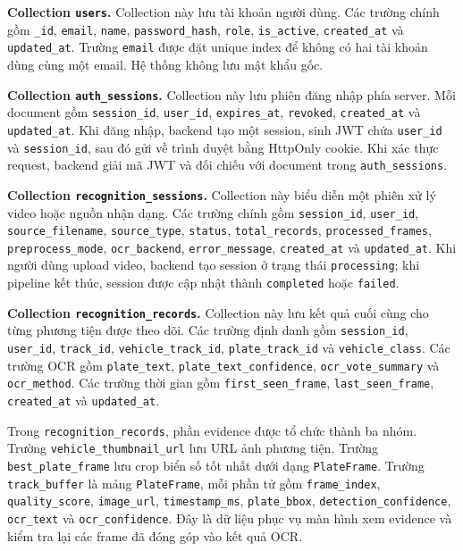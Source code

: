 \documentclass[../DoAn.tex]{subfiles}
\begin{document}
\textbf{Collection \texttt{users}.} Collection này lưu tài khoản người dùng. Các trường chính gồm \texttt{\_id}, \texttt{email}, \texttt{name}, \texttt{password\_hash}, \texttt{role}, \texttt{is\_active}, \texttt{created\_at} và \texttt{updated\_at}. Trường \texttt{email} được đặt unique index để không có hai tài khoản dùng cùng một email. Hệ thống không lưu mật khẩu gốc.

\textbf{Collection \texttt{auth\_sessions}.} Collection này lưu phiên đăng nhập phía server. Mỗi document gồm \texttt{session\_id}, \texttt{user\_id}, \texttt{expires\_at}, \texttt{revoked}, \texttt{created\_at} và \texttt{updated\_at}. Khi đăng nhập, backend tạo một session, sinh JWT chứa \texttt{user\_id} và \texttt{session\_id}, sau đó gửi về trình duyệt bằng HttpOnly cookie. Khi xác thực request, backend giải mã JWT và đối chiếu với document trong \texttt{auth\_sessions}.

\textbf{Collection \texttt{recognition\_sessions}.} Collection này biểu diễn một phiên xử lý video hoặc nguồn nhận dạng. Các trường chính gồm \texttt{session\_id}, \texttt{user\_id}, \texttt{source\_filename}, \texttt{source\_type}, \texttt{status}, \texttt{total\_records}, \texttt{processed\_frames}, \texttt{preprocess\_mode}, \texttt{ocr\_backend}, \texttt{error\_message}, \texttt{created\_at} và \texttt{updated\_at}. Khi người dùng upload video, backend tạo session ở trạng thái \texttt{processing}; khi pipeline kết thúc, session được cập nhật thành \texttt{completed} hoặc \texttt{failed}.

\textbf{Collection \texttt{recognition\_records}.} Collection này lưu kết quả cuối cùng cho từng phương tiện được theo dõi. Các trường định danh gồm \texttt{session\_id}, \texttt{user\_id}, \texttt{track\_id}, \texttt{vehicle\_track\_id}, \texttt{plate\_track\_id} và \texttt{vehicle\_class}. Các trường OCR gồm \texttt{plate\_text}, \texttt{plate\_text\_confidence}, \texttt{ocr\_vote\_summary} và \texttt{ocr\_method}. Các trường thời gian gồm \texttt{first\_seen\_frame}, \texttt{last\_seen\_frame}, \texttt{created\_at} và \texttt{updated\_at}.

Trong \texttt{recognition\_records}, phần evidence được tổ chức thành ba nhóm. Trường \texttt{vehicle\_thumbnail\_url} lưu URL ảnh phương tiện. Trường \texttt{best\_plate\_frame} lưu crop biển số tốt nhất dưới dạng \texttt{PlateFrame}. Trường \texttt{track\_buffer} là mảng \texttt{PlateFrame}, mỗi phần tử gồm \texttt{frame\_index}, \texttt{quality\_score}, \texttt{image\_url}, \texttt{timestamp\_ms}, \texttt{plate\_bbox}, \texttt{detection\_confidence}, \texttt{ocr\_text} và \texttt{ocr\_confidence}. Đây là dữ liệu phục vụ màn hình xem evidence và kiểm tra lại các frame đã đóng góp vào kết quả OCR.
\end{document}
